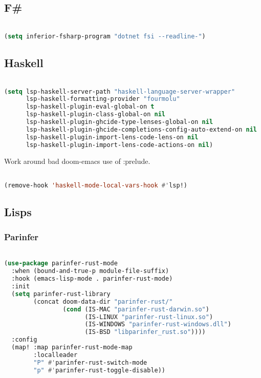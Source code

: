 \documentclass[11pt]{article}
\begin{document}
\subsection{F\#}
\label{sec:f}
\begin{lstlisting}[language=Lisp]%! Someone please complete this list for me

(setq inferior-fsharp-program "dotnet fsi --readline-")
\end{lstlisting}

\subsection{Haskell}
\label{sec:haskell}
\begin{lstlisting}[language=Lisp]%! Someone please complete this list for me

(setq lsp-haskell-server-path "haskell-language-server-wrapper"
      lsp-haskell-formatting-provider "fourmolu"
      lsp-haskell-plugin-eval-global-on t
      lsp-haskell-plugin-class-global-on nil
      lsp-haskell-plugin-ghcide-type-lenses-global-on nil
      lsp-haskell-plugin-ghcide-completions-config-auto-extend-on nil
      lsp-haskell-plugin-import-lens-code-lens-on nil
      lsp-haskell-plugin-import-lens-code-actions-on nil)
\end{lstlisting}

Work around bad doom-emacs use of :prelude.

\begin{lstlisting}[language=Lisp]%! Someone please complete this list for me

(remove-hook 'haskell-mode-local-vars-hook #'lsp!)
\end{lstlisting}

\subsection{Lisps}
\label{sec:lisps}


\subsubsection{Parinfer}
\label{sec:parinfer}
\begin{lstlisting}[language=Lisp]%! Someone please complete this list for me

(use-package parinfer-rust-mode
  :when (bound-and-true-p module-file-suffix)
  :hook (emacs-lisp-mode . parinfer-rust-mode)
  :init
  (setq parinfer-rust-library
        (concat doom-data-dir "parinfer-rust/"
                (cond (IS-MAC "parinfer-rust-darwin.so")
                      (IS-LINUX "parinfer-rust-linux.so")
                      (IS-WINDOWS "parinfer-rust-windows.dll")
                      (IS-BSD "libparinfer_rust.so"))))
  :config
  (map! :map parinfer-rust-mode-map
        :localleader
        "P" #'parinfer-rust-switch-mode
        "p" #'parinfer-rust-toggle-disable))
\end{lstlisting}
\end{document}
